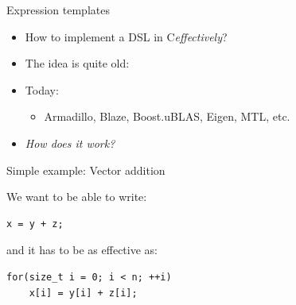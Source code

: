 \documentclass[@BEAMER_OPTIONS@]{beamer}
\newcommand{\CXX}{{\rm C}\plusplus}
\begin{document}
\begin{frame}{Expression templates}
    \begin{itemize}
        \item How to implement a DSL in \CXX \emph{effectively}?
            \vspace{\baselineskip}
        \item The idea is quite old:
        \item Today:
            \begin{itemize}
                \item Armadillo, Blaze, Boost.uBLAS, Eigen, MTL, etc.
            \end{itemize}
            \vspace{\baselineskip}
        \item \alert{\emph{How does it work?}}
    \end{itemize}
\end{frame}

\note{ }

\begin{frame}[fragile]{Simple example: Vector addition}
    \begin{exampleblock}{We want to be able to write:}
        \begin{lstlisting}
x = y + z;
        \end{lstlisting}
    \end{exampleblock}

    \begin{exampleblock}{and it has to be as effective as:}
        \begin{lstlisting}
for(size_t i = 0; i < n; ++i)
    x[i] = y[i] + z[i];
        \end{lstlisting}
    \end{exampleblock}
\end{frame}
\end{document}
